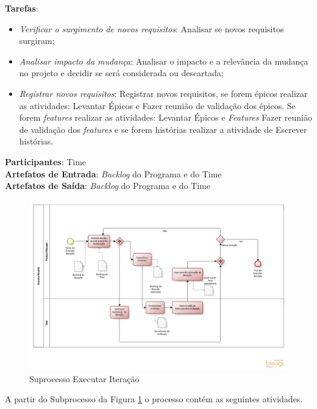   \textbf{Tarefas}:
  \begin{itemize}
   \item \indent \textit{Verificar o surgimento de novos requisitos}: Analisar se novos requisitos surgiram;

   \item \indent \textit{Analisar impacto da mudança}: Analisar o impacto e a relevância da mudança no projeto e decidir se será considerada
   ou descartada;

   \item \indent \textit{Registrar novos requisitos}: Registrar novos requisitos, se forem épicos realizar as atividades: Levantar Épicos e 
   Fazer reunião de validação dos épicos. Se forem \textit{features} realizar as atividades: Levantar Épicos e \textit{Features}  
   Fazer reunião de validação dos \textit{features} e se forem histórias realizar a atividade de Escrever histórias.
  
  \end{itemize}

  \textbf{Participantes}: Time\\

  \textbf{Artefatos de Entrada}: \textit{Backlog} do Programa e do Time \\

  \textbf{Artefatos de Saída}:  \textit{Backlog} do Programa e do Time \\

\begin{figure}[!htb]
\includegraphics[scale=0.5]{figuras/iteracao.png}
\caption{Suprocesso Executar Iteração}
\label{fig:iteracao}
\end{figure}

A partir do Subprocesso da Figura \ref{fig:iteracao} o processo contém as seguintes atividades.

